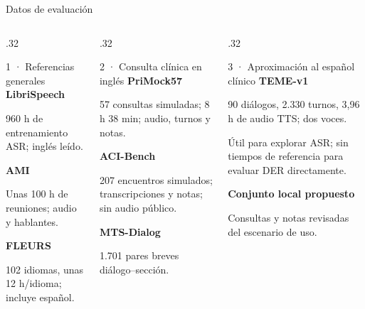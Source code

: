 \documentclass[aspectratio=169,10pt]{beamer}
\begin{document}
\begin{frame}{Datos de evaluación}
  \begin{columns}[T,onlytextwidth]
    \begin{column}{.32\textwidth}
      \begin{block}{\small 1 · Referencias generales}
        \small\textbf{LibriSpeech}\par 960 h de entrenamiento ASR; inglés leído.\par\vspace{3mm}
        \textbf{AMI}\par Unas 100 h de reuniones; audio y hablantes.\par\vspace{3mm}
        \textbf{FLEURS}\par 102 idiomas, unas 12 h/idioma; incluye español.
      \end{block}
    \end{column}
    \begin{column}{.32\textwidth}
      \begin{block}{\small 2 · Consulta clínica en inglés}
        \small\textbf{PriMock57}\par 57 consultas simuladas; 8 h 38 min; audio, turnos y notas.\par\vspace{3mm}
        \textbf{ACI-Bench}\par 207 encuentros simulados; transcripciones y notas; sin audio público.\par\vspace{3mm}
        \textbf{MTS-Dialog}\par 1.701 pares breves diálogo–sección.
      \end{block}
    \end{column}
    \begin{column}{.32\textwidth}
      \begin{block}{\small 3 · Aproximación al español clínico}
        \small\textbf{TEME-v1}\par 90 diálogos, 2.330 turnos, 3,96 h de audio TTS; dos voces.\par\vspace{3mm}
        Útil para explorar ASR; sin tiempos de referencia para evaluar DER directamente.\par\vspace{3mm}
        \textbf{Conjunto local propuesto}\par Consultas y notas revisadas del escenario de uso.
      \end{block}
    \end{column}
  \end{columns}
\end{frame}
\end{document}
